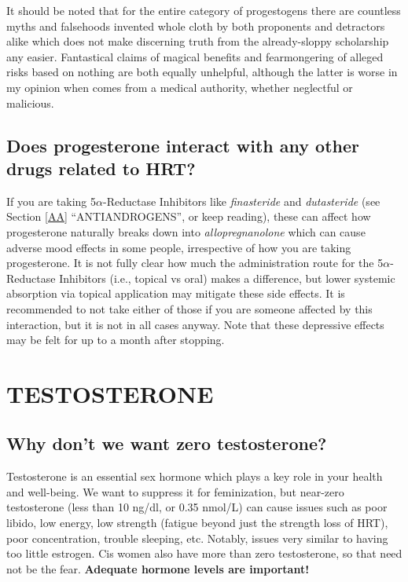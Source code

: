 \documentclass{article}
\begin{document}
It should be noted that for the entire category of progestogens there are countless myths and falsehoods invented whole cloth by both proponents and detractors alike which does not make discerning truth from the already-sloppy scholarship any easier. Fantastical claims of magical benefits and fearmongering of alleged risks based on nothing are both equally unhelpful, although the latter is worse in my opinion when comes from a medical authority, whether neglectful or malicious.

\subsection{Does progesterone interact with any other drugs related to HRT?}\label{8-18}

If you are taking 5$\alpha$-Reductase Inhibitors like \textit{finasteride} and \textit{dutasteride} (see Section \ref{AA} “ANTIANDROGENS”, or keep reading), these can affect how progesterone naturally breaks down into \textit{allopregnanolone} which can cause adverse mood effects in some people, irrespective of how you are taking progesterone. It is not fully clear how much the administration route for the 5$\alpha$-Reductase Inhibitors (i.e., topical vs oral) makes a difference, but lower systemic absorption via topical application may mitigate these side effects. It is recommended to not take either of those if you are someone affected by this interaction, but it is not in all cases anyway. Note that these depressive effects may be felt for up to a month after stopping.


\section{TESTOSTERONE}\label{T}

\subsection{Why don’t we want zero testosterone?}

Testosterone is an essential sex hormone which plays a key role in your health and well-being. We want to suppress it for feminization, but near-zero testosterone (less than 10 ng/dl, or 0.35 nmol/L) can cause issues such as poor libido, low energy, low strength (fatigue beyond just the strength loss of HRT), poor concentration, trouble sleeping, etc. Notably, issues very similar to having too little estrogen. Cis women also have more than zero testosterone, so that need not be the fear. \textbf{Adequate hormone levels are important!}
\end{document}
